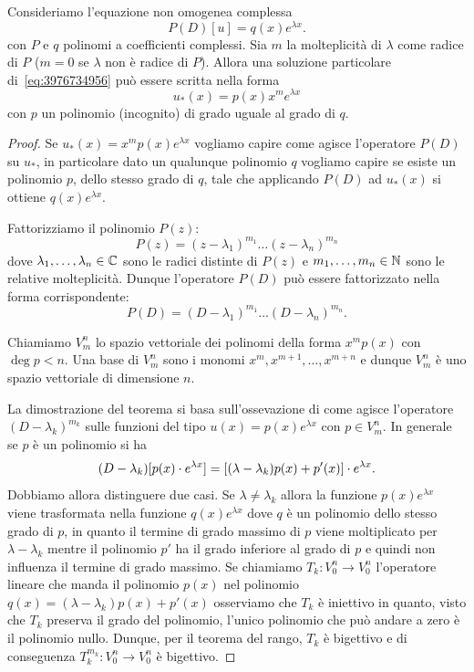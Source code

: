\begin{theorem}
\mymark{***}
Consideriamo l'equazione non omogenea complessa
\begin{equation}\label{eq:3976734956}
 P(D) [u] = q(x) e^{\lambda x}.
\end{equation}
con $P$ e $q$ polinomi a coefficienti complessi.
Sia $m$ la molteplicità di $\lambda$ come radice di $P$ ($m=0$ se $\lambda$ non è radice di $P$).
Allora una soluzione particolare di~\eqref{eq:3976734956} può essere scritta nella forma
\begin{equation}
\label{eq:945396}
u_*(x) = p(x) x^m e^{\lambda x}
\end{equation}
con $p$ un polinomio (incognito) di grado uguale al grado di $q$.
\end{theorem}
%
\begin{proof}
Se $u_*(x) = x^m p(x) e^{\lambda x}$ vogliamo capire come agisce l'operatore $P(D)$ su $u_*$, in particolare
dato un qualunque polinomio $q$ vogliamo capire
se esiste un polinomio $p$, dello stesso grado di $q$, tale che applicando $P(D)$ ad $u_*(x)$ si ottiene $q(x) e^{\lambda x}$.

Fattorizziamo il polinomio $P(z)$:
\[
  P(z) = (z-\lambda_1)^{m_1}\dots (z-\lambda_n)^{m_n}
\]
dove $\lambda_1, \dots, \lambda_n\in {\mathbb C}$ sono le radici distinte di $P(z)$ e $m_1,\dots,m_n\in {\mathbb N}$ sono le relative molteplicità. Dunque l'operatore $P(D)$ può essere fattorizzato nella forma corrispondente:
\[
   P(D) = (D-\lambda_1)^{m_1} \dots (D-\lambda_n)^{m_n}.
\]

Chiamiamo $V^n_m$ lo spazio vettoriale dei polinomi della forma $x^m p(x)$ con $\deg p<n$. 
Una base di $V^n_m$ sono i monomi $x^m, x^{m+1}, \dots, x^{m+n}$ e dunque $V^n_m$ è uno 
spazio vettoriale di dimensione $n$.

La dimostrazione del teorema si basa sull'ossevazione di come agisce l'operatore $(D-\lambda_k)^{m_k}$ 
sulle funzioni del tipo $u(x) = p(x) e^{\lambda x}$ con $p\in V^n_m$. In generale se $p$ è un 
polinomio si ha
\[
 (D-\lambda_k) [p(x)\cdot e^{\lambda x}]
 = {\left[ (\lambda -\lambda_k)p(x) + p'(x) \right]} \cdot e^{\lambda x}.
\]
Dobbiamo allora distinguere due casi. Se $\lambda\neq \lambda_k$ allora la funzione $p(x) e^{\lambda x}$ viene trasformata nella funzione $q(x) e^{\lambda x}$ dove $q$ è un polinomio dello stesso grado di $p$, in quanto il termine di grado massimo di $p$ viene moltiplicato per $\lambda-\lambda_k$ mentre il polinomio $p'$ ha il grado inferiore al grado di $p$ e quindi non influenza il termine di grado massimo. Se chiamiamo $T_k\colon V^n_0 \to V^n_0$ l'operatore lineare che manda il polinomio $p(x)$ nel polinomio $q(x)=(\lambda-\lambda_k) p(x) + p'(x)$ osserviamo che $T_k$ è iniettivo in quanto, visto che $T_k$ preserva il grado del polinomio, l'unico polinomio che può andare a zero è il polinomio nullo. Dunque, per il teorema del rango, $T_k$ è bigettivo e di conseguenza $T_k^{m_k} \colon V^n_0 \to V^n_0$ è bigettivo.


\end{proof}
